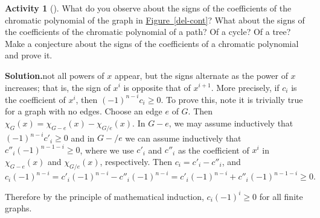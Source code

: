 \documentclass[10pt,]{book}
\theoremstyle{plain}
\theoremstyle{definition}
\newtheorem{activity}[project]{Activity}
\numberwithin{equation}{chapter}
\begin{document}
\begin{activity}[]\label{activity-239}
What do you observe about the signs of the coefficients of the chromatic polynomial of the graph in \hyperref[del-cont]{Figure~\ref{del-cont}}? What about the signs of the coefficients of the chromatic polynomial of a path? Of a cycle? Of a tree? Make a conjecture about the signs of the coefficients of a chromatic polynomial and prove it.%
\par\medskip\noindent%
\textbf{Solution.}\quad not all powers of \(x\) appear, but the signs alternate as the power of \(x\) increases; that is, the sign of \(x^i\) is opposite that of \(x^{i+1}\). More precisely, if \(c_i\) is the coefficient of \(x^i\), then \((-1)^{n-i}c_i\ge 0\). To prove this, note it is trivially true for a graph with no edges. Choose an edge \(e\) of \(G\). Then \(\chi_G(x) =
\chi_{G-e}(x)-\chi_{G/e}(x)\). In \(G-e\), we may assume inductively that \((-1)^{n-i}c'_i\ge0\) and in \(G-/e\) we can assume inductively that \(c''_i(-1)^{n-1-i}\ge0\), where we use \(c'_i\) and \(c''_i\) as the coefficient of \(x^i\) in \(\chi_{G-e}(x)\) and \(\chi_{G/e}(x)\), respectively. Then \(c_i=c'_i
-c''_i\), and%
\begin{equation*}
c_i(-1)^{n-i}=c'_i(-1)^{n-i}-c''_i(-1)^{n-i}=c'_i(-1)^{n-i}+c''_i(-1)^{n-1-i}
\ge0.
\end{equation*}
%
\par
Therefore by the principle of mathematical induction, \(c_i(-1)^i\ge0\) for all finite graphs.%
\end{activity}
\typeout{************************************************}
\typeout{************************************************}
\end{document}
